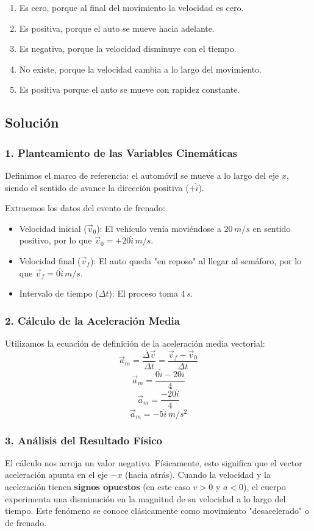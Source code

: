 \documentclass[12pt, a4paper]{article}
\begin{document}
\begin{enumerate}[label=\alph*)]
    \item Es cero, porque al final del movimiento la velocidad es cero.
    \item Es positiva, porque el auto se mueve hacia adelante.
    \item Es negativa, porque la velocidad disminuye con el tiempo.
    \item No existe, porque la velocidad cambia a lo largo del movimiento.
    \item Es positiva porque el auto se mueve con rapidez constante.
\end{enumerate}

\subsection*{Solución}

\subsubsection*{1. Planteamiento de las Variables Cinemáticas}
Definimos el marco de referencia: el automóvil se mueve a lo largo del eje $x$, siendo el sentido de avance la dirección positiva ($+\hat{i}$).

Extraemos los datos del evento de frenado:
\begin{itemize}
    \item Velocidad inicial ($\vec{v}_0$): El vehículo venía moviéndose a $20 \, \si{m/s}$ en sentido positivo, por lo que $\vec{v}_0 = +20\hat{i} \, \si{m/s}$.
    \item Velocidad final ($\vec{v}_f$): El auto queda "en reposo" al llegar al semáforo, por lo que $\vec{v}_f = 0\hat{i} \, \si{m/s}$.
    \item Intervalo de tiempo ($\Delta t$): El proceso toma $4 \, \si{s}$.
\end{itemize}

\subsubsection*{2. Cálculo de la Aceleración Media}
Utilizamos la ecuación de definición de la aceleración media vectorial:
$$ \vec{a}_m = \frac{\Delta \vec{v}}{\Delta t} = \frac{\vec{v}_f - \vec{v}_0}{\Delta t} $$
$$ \vec{a}_m = \frac{0\hat{i} - 20\hat{i}}{4} $$
$$ \vec{a}_m = \frac{-20\hat{i}}{4} $$
$$ \vec{a}_m = -5\hat{i} \, \si{m/s^2} $$

\subsubsection*{3. Análisis del Resultado Físico}
El cálculo nos arroja un valor negativo. Físicamente, esto significa que el vector aceleración apunta en el eje $-x$ (hacia atrás). 
Cuando la velocidad y la aceleración tienen \textbf{signos opuestos} (en este caso $v > 0$ y $a < 0$), el cuerpo experimenta una disminución en la magnitud de su velocidad a lo largo del tiempo. Este fenómeno se conoce clásicamente como movimiento "desacelerado" o de frenado.
\end{document}
